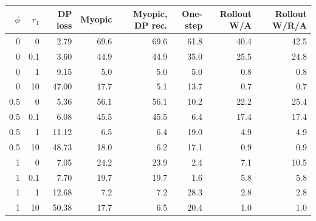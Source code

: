 \begin{tabular}{rrrrrrrr}
\toprule
$\phi$ & $r_1$ & DP loss & Myopic & Myopic, DP rec. & One-step & Rollout W/A & Rollout W/R/A \\
\midrule
0 & 0 & 2.79 & 69.6 & 69.6 & 61.8 & 40.4 & 42.5 \\
0 & 0.1 & 3.60 & 44.9 & 44.9 & 35.0 & 25.5 & 24.8 \\
0 & 1 & 9.15 & 5.0 & 5.0 & 5.0 & 0.8 & 0.8 \\
0 & 10 & 47.00 & 17.7 & 5.1 & 13.7 & 0.7 & 0.7 \\
0.5 & 0 & 5.36 & 56.1 & 56.1 & 10.2 & 22.2 & 25.4 \\
0.5 & 0.1 & 6.08 & 45.5 & 45.5 & 6.4 & 17.4 & 17.4 \\
0.5 & 1 & 11.12 & 6.5 & 6.4 & 19.0 & 4.9 & 4.9 \\
0.5 & 10 & 48.73 & 18.0 & 6.2 & 17.1 & 0.9 & 0.9 \\
1 & 0 & 7.05 & 24.2 & 23.9 & 2.4 & 7.1 & 10.5 \\
1 & 0.1 & 7.70 & 19.7 & 19.7 & 1.6 & 5.8 & 5.8 \\
1 & 1 & 12.68 & 7.2 & 7.2 & 28.3 & 2.8 & 2.8 \\
1 & 10 & 50.38 & 17.7 & 6.5 & 20.4 & 1.0 & 1.0 \\
\bottomrule
\end{tabular}

